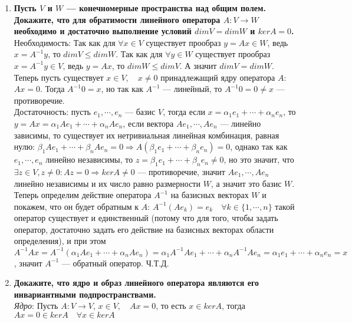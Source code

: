 \documentclass[12pt]{article} %
\begin{document}
\begin{enumerate}
    \item \textbf{Пусть $V$ и $W$ --- конечномерные пространства над общим полем. Докажите, что для обратимости линейного оператора $A: V \rightarrow W$ необходимо и достаточно выполнение условий $dimV = dimW$ и $kerA = 0$.}\\

    Необходимость: Так как для $\forall x \in V$ существует прообраз $y = Ax \in W$, ведь $x = A^{-1}y$, то $dimV \leqslant dimW$. Так как для $\forall y \in W$ существует прообраз $x = A^{-1}y \in V$, ведь $y = Ax$, то $dimW \leqslant dimV$. А значит $dimV = dimW$. Теперь пусть существует $x \in V, \quad x \neq 0$ принадлежащий ядру оператора $A$: $Ax = 0$. Тогда $A^{-1}0 = x$, но так как $A^{-1}$ --- линейный, то $A^{-1}0 = 0 \neq x$ --- противоречие.\\

    Достаточность: пусть $e_1, \cdots, e_n$ --- базис $V$, тогда если $x = \alpha_1 e_1 + \cdots + \alpha_n e_n$, то $y = Ax = \alpha_1 Ae_1 + \cdots + \alpha_n Ae_n$, если вектора $Ae_1, \cdots, Ae_n$ --- линейно зависимы, то существует их нетривиальная линейная комбинация, равная нулю: $\beta_1Ae_1 + \cdots + \beta_nAe_n = 0 \Rightarrow A(\beta_1 e_1 + \cdots + \beta_n e_n) = 0$, однако так как $e_1, \cdots, e_n$ линейно независимы, то $z = \beta_1 e_1 + \cdots + \beta_n e_n \neq 0$, но это значит, что $\exists z \in V, z \neq 0 : Az = 0 \Rightarrow kerA \neq 0$ --- противоречие, значит $Ae_1, \cdots, Ae_n$ линейно независимы и их число равно размерности $W$, а значит это базис $W$.\\
    
    Теперь определим действие оператора $A^{-1}$ на базисных векторах $W$ и покажем, что он будет обратным к $A$:
    $A^{-1}(Ae_k) = e_k \quad \forall k \in \{1, \cdots, n\}$ такой оператор существует и единственный (потому что для того, чтобы задать оператор, достаточно задать его действие на базисных векторах области определения), и при этом $A^{-1}Ax = A^{-1}(\alpha_1 Ae_1 + \cdots + \alpha_n Ae_n) = \alpha_1 A^{-1} Ae_1 + \cdots + \alpha_n A^{-1} Ae_n = \alpha_1 e_1 + \cdots + \alpha_n e_n = x$, значит $A^{-1}$ --- обратный оператор. Ч.Т.Д.
    \item \textbf{Докажите, что ядро и образ линейного оператора являются его инвариантными подпространствами.}\\

    \textit{Ядро}: Пусть $A: V \rightarrow V$, $x \in  V,\quad Ax = 0$, то есть $x \in kerA$, тогда $Ax = 0 \in kerA \quad \forall x \in kerA$\\


\end{enumerate}
\end{document}
